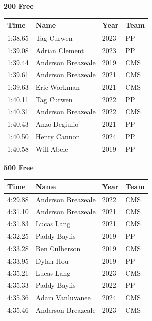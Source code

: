 \vspace{1.2em}
\noindent\begin{minipage}[t]{0.98\textwidth}
\centering
\textbf{\textcolor{teamprimary}{200 Free}}\par
\vspace{0.5em}
\centering
\small
\renewcommand{\arraystretch}{1.0}
\setlength{\tabcolsep}{4pt}
\begin{tabular}{@{}p{2.5cm}p{4.5cm}p{1.5cm}p{2.5cm}@{}}
\toprule
\textbf{Time} & \textbf{Name} & \textbf{Year} & \textbf{Team} \\
\midrule
1:38.65 & Tag Curwen & 2023 & PP \\
1:39.08 & Adrian Clement & 2023 & PP \\
1:39.44 & Anderson Breazeale & 2019 & CMS \\
1:39.61 & Anderson Breazeale & 2021 & CMS \\
1:39.63 & Eric Workman & 2021 & CMS \\
1:40.11 & Tag Curwen & 2022 & PP \\
1:40.31 & Anderson Breazeale & 2022 & CMS \\
1:40.43 & Anzo Degiulio & 2021 & PP \\
1:40.50 & Henry Cannon & 2024 & PP \\
1:40.58 & Will Abele & 2019 & PP \\
\bottomrule
\end{tabular}
\end{minipage}
\vspace{1.2em}
\noindent\begin{minipage}[t]{0.98\textwidth}
\centering
\textbf{\textcolor{teamprimary}{500 Free}}\par
\vspace{0.5em}
\centering
\small
\renewcommand{\arraystretch}{1.0}
\setlength{\tabcolsep}{4pt}
\begin{tabular}{@{}p{2.5cm}p{4.5cm}p{1.5cm}p{2.5cm}@{}}
\toprule
\textbf{Time} & \textbf{Name} & \textbf{Year} & \textbf{Team} \\
\midrule
4:29.88 & Anderson Breazeale & 2022 & CMS \\
4:31.10 & Anderson Breazeale & 2021 & CMS \\
4:31.83 & Lucas Lang & 2021 & CMS \\
4:32.25 & Paddy Baylis & 2019 & PP \\
4:33.28 & Ben Culberson & 2019 & CMS \\
4:33.95 & Dylan Hou & 2019 & PP \\
4:35.21 & Lucas Lang & 2023 & CMS \\
4:35.33 & Paddy Baylis & 2022 & PP \\
4:35.36 & Adam Vanluvanee & 2024 & CMS \\
4:35.46 & Anderson Breazeale & 2023 & CMS \\
\bottomrule
\end{tabular}
\end{minipage}
